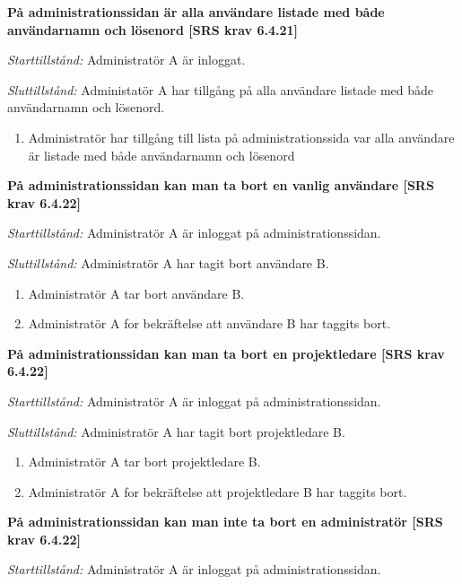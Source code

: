 \documentclass[a4paper]{article}
\begin{document}
\begin{FT}
\item %
\textbf{På administrationssidan är alla användare listade med både användarnamn och lösenord [SRS krav 6.4.21]}

\emph{Starttillstånd:} Administratör A är inloggat.

\emph{Sluttillstånd:} Administatör A har tillgång på alla användare listade med både användarnamn och lösenord.

\begin{enumerate}
\item Administratör har tillgång till lista på administrationssida var alla användare är listade med både användarnamn och lösenord
\end{enumerate}

\item %
\textbf{På administrationssidan kan man ta bort en vanlig användare [SRS krav 6.4.22]}

\emph{Starttillstånd:} Administratör A är inloggat på administrationssidan.

\emph{Sluttillstånd:} Administratör A har tagit bort  användare B.

\begin{enumerate}
\item Administratör A tar bort  användare B.
\item Administratör A for bekräftelse att  användare B har taggits  bort. 
\end{enumerate}

\item %
\textbf{På administrationssidan kan man ta bort en projektledare [SRS krav 6.4.22]}

\emph{Starttillstånd:} Administratör A är inloggat på administrationssidan.

\emph{Sluttillstånd:} Administratör A har tagit bort  projektledare B.

\begin{enumerate}
\item Administratör A tar bort  projektledare B.
\item Administratör A for bekräftelse att  projektledare B har taggits bort. 
\end{enumerate}

\item %
\textbf{På administrationssidan kan man inte ta bort en administratör [SRS krav 6.4.22]}

\emph{Starttillstånd:} Administratör A är inloggat på administrationssidan.


\end{FT}
\end{document}
